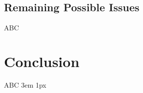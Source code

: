 \documentclass{Academic}
\begin{document}
    \subsection{Remaining Possible Issues}
    ABC
    \section{Conclusion}
    ABC
    \singlespacing
    \emergencystretch 3em
    \hfuzz 1px
    \printbibliography[heading=bibnumbered]




\end{document}
